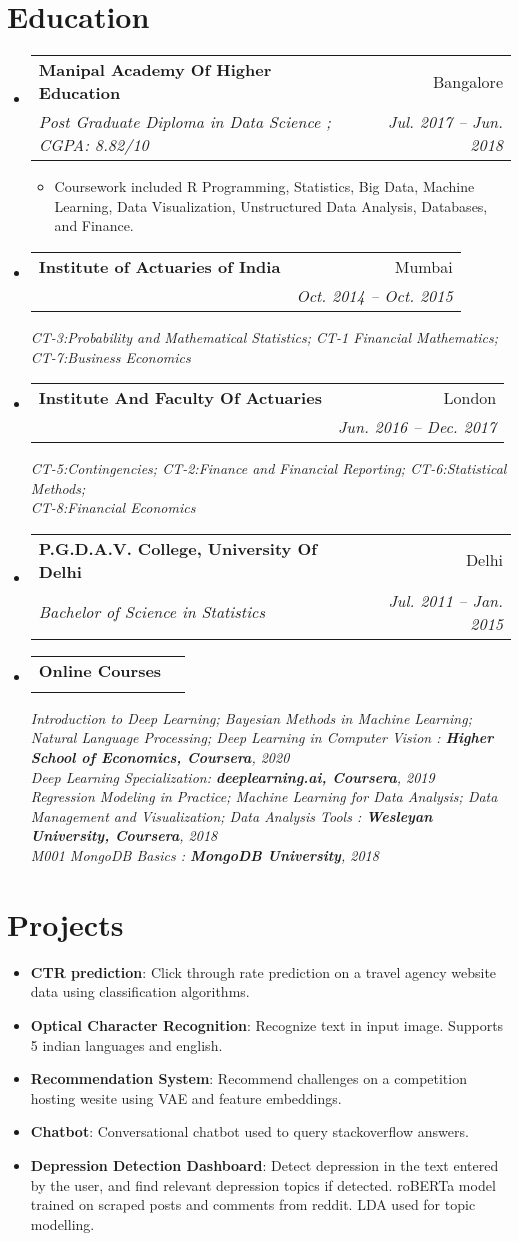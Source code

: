 \documentclass[letterpaper,11pt]{article}
\makeatletter
\newcommand{\resumeItem}[2]{
  \item\small{
    \textbf{#1}{: #2 \vspace{-2pt}}
  }
}
\newcommand{\textItem}[1]{
  \item\small{
    {#1 \vspace{-2pt}}
  }
}
\newcommand{\resumeSubheading}[4]{
  \vspace{-1pt}\item
    \begin{tabular*}{0.97\textwidth}[t]{l@{\extracolsep{\fill}}r}
      \textbf{#1} & #2 \\
      \textit{\small#3} & \textit{\small #4} \\
    \end{tabular*}\vspace{-5pt}
}
\newcommand{\resumeSubItem}[2]{\resumeItem{#1}{#2}\vspace{-4pt}}
\newcommand{\resumeSubHeadingListStart}{\begin{itemize}[leftmargin=*]}
\newcommand{\resumeSubHeadingListEnd}{\end{itemize}}
\newcommand{\resumeItemListStart}{\begin{itemize}}
\newcommand{\resumeItemListEnd}{\end{itemize}\vspace{-5pt}}
\makeatother
\begin{document}
\section{Education}
  \resumeSubHeadingListStart
    \resumeSubheading
      {Manipal Academy Of Higher Education}{Bangalore}
      {Post Graduate Diploma in Data Science ;  CGPA: 8.82/10}{Jul. 2017 -- Jun. 2018}
      \resumeItemListStart
      	\textItem{Coursework included R Programming, Statistics, Big Data, Machine Learning, Data Visualization, Unstructured Data Analysis, Databases, and Finance.}
      \resumeItemListEnd	
    \resumeSubheading
      {Institute of Actuaries of India}{Mumbai}{}{Oct. 2014 -- Oct. 2015\vspace{-7pt}}
      \textit{\small CT-3:Probability and Mathematical Statistics; CT-1 Financial Mathematics;}\\
      \textit{\small CT-7:Business Economics}
    \resumeSubheading
      {Institute And Faculty Of Actuaries}{London}{}{Jun. 2016 -- Dec. 2017\vspace{-7pt}}
      \textit{\small CT-5:Contingencies; CT-2:Finance and Financial Reporting; CT-6:Statistical Methods;}\\
      \textit{\small CT-8:Financial Economics} 
	\resumeSubheading
	  {P.G.D.A.V. College, University Of Delhi}{Delhi}
	  {Bachelor of Science in Statistics}{Jul. 2011 -- Jan. 2015}
	\resumeSubheading
	  {Online Courses}{}{}{}
	  \textit{\small Introduction to Deep Learning; Bayesian Methods in Machine Learning; Natural Language Processing; Deep Learning in Computer Vision : \textbf{Higher School of Economics, Coursera}, 2020}\\
	  \textit{\small Deep Learning Specialization: \textbf{deeplearning.ai, Coursera}, 2019}\\
	  \textit{\small Regression Modeling in Practice; Machine Learning for Data Analysis; Data Management and Visualization; Data Analysis Tools : \textbf{Wesleyan University, Coursera}, 2018}\\
	  \textit{\small M001 MongoDB Basics : \textbf{MongoDB University}, 2018}	      
  \resumeSubHeadingListEnd
  

\section{Projects}
  \resumeSubHeadingListStart
    \resumeSubItem{CTR prediction}
      {Click through rate prediction on a travel agency website data using classification algorithms.}
    \resumeSubItem{Optical Character Recognition}
      {Recognize text in input image. Supports 5 indian languages and english.}
    \resumeSubItem{Recommendation System}
      {Recommend challenges on a competition hosting wesite using VAE and feature embeddings.}
    \resumeSubItem{Chatbot}
      {Conversational chatbot used to query stackoverflow answers.}
    \resumeSubItem{Depression Detection Dashboard}
      {Detect depression in the text entered by the user, and find relevant depression topics if detected. 
      roBERTa model trained on scraped posts and comments from reddit. LDA used for topic modelling.}  
  \resumeSubHeadingListEnd
\end{document}
